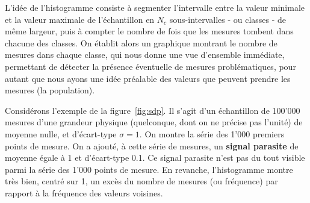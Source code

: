 L'idée de l'histogramme consiste à segmenter l'intervalle entre la valeur minimale et la valeur maximale de l'échantillon en $N_c$ sous-intervalles - ou classes - de même largeur, puis à compter le nombre de fois que les mesures tombent dans chacune des classes. On établit alors un graphique montrant le nombre de mesures dans chaque classe, qui nous donne une vue d'ensemble immédiate, permettant de détecter la présence éventuelle de mesures problématiques, pour autant que nous ayons une idée préalable des valeurs que peuvent prendre les mesures (la population).

Considérons l'exemple de la figure~\ref{fig:sdp}. Il s'agit d'un échantillon de 100'000 mesures d'une grandeur physique (quelconque, dont on ne précise pas l'unité) de moyenne nulle, et d'écart-type $\sigma=1$. On montre la série des 1'000 premiers points de mesure. On a ajouté, à cette série de mesures, un \textbf{signal parasite} de moyenne égale à 1 et d'écart-type 0.1. Ce signal parasite n'est pas du tout visible parmi la série des 1'000 points de mesure. En revanche, l'histogramme montre très bien, centré sur 1, un excès du nombre de mesures (ou fréquence) par rapport à la fréquence des valeurs voisines.

